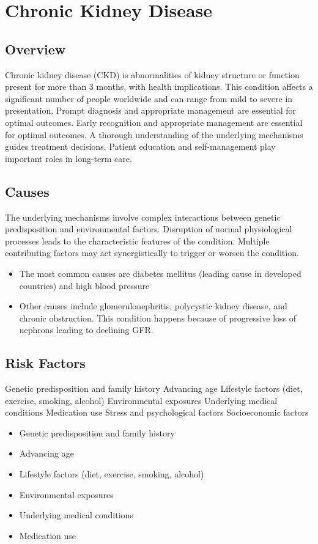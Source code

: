 \chapter{Chronic Kidney Disease}
\label{sec:Chronic Kidney Disease}

\section{Overview}
Chronic kidney disease (CKD) is abnormalities of kidney structure or function present for more than 3 months, with health implications. This condition affects a significant number of people worldwide and can range from mild to severe in presentation. Prompt diagnosis and appropriate management are essential for optimal outcomes. Early recognition and appropriate management are essential for optimal outcomes. A thorough understanding of the underlying mechanisms guides treatment decisions. Patient education and self-management play important roles in long-term care.
\section{Causes}
The underlying mechanisms involve complex interactions between genetic predisposition and environmental factors. Disruption of normal physiological processes leads to the characteristic features of the condition. Multiple contributing factors may act synergistically to trigger or worsen the condition.

\begin{itemize}[noitemsep]
  \item The most common causes are diabetes mellitus (leading cause in developed countries) and high blood pressure
  \item Other causes include glomerulonephritis, polycystic kidney disease, and chronic obstruction. This condition happens because of progressive loss of nephrons leading to declining GFR.
\end{itemize}
\section{Risk Factors}
Genetic predisposition and family history Advancing age Lifestyle factors (diet, exercise, smoking, alcohol) Environmental exposures Underlying medical conditions Medication use Stress and psychological factors Socioeconomic factors

\begin{itemize}[noitemsep]
  \item Genetic predisposition and family history
  \item Advancing age
  \item Lifestyle factors (diet, exercise, smoking, alcohol)
  \item Environmental exposures
  \item Underlying medical conditions
  \item Medication use
\end{itemize}
